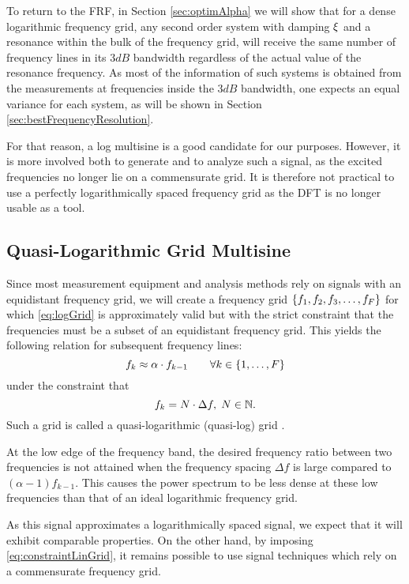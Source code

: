   To return to the FRF, in Section \ref{sec:optimAlpha} we will show that for a dense logarithmic frequency grid, any second order system with damping $\xi$ and a resonance within the bulk of the frequency grid, will receive the same number of frequency lines in its $3 \unit{dB}$ bandwidth regardless of the actual value of the resonance frequency.
  As most of the information of such systems is obtained from the measurements at frequencies inside the $3 \unit{dB}$
  bandwidth, one expects an equal variance for each system, as will be shown in Section \ref{sec:bestFrequencyResolution}.
  
  For that reason, a log multisine is a good candidate for our purposes.
  However, it is more involved both to generate and to analyze such a signal,
  as the excited frequencies no longer lie on a commensurate grid.
  It is therefore not practical to use a perfectly logarithmically spaced frequency grid as the DFT is no longer usable as a tool.
  
\subsection{Quasi-Logarithmic Grid Multisine}
  Since most measurement equipment and analysis methods rely on signals with an equidistant frequency grid, we will create a frequency grid
  $\left\{f_1, f_2, f_3,\ldots, f_F\right\}$ for which \eqref{eq:logGrid} is approximately 
  valid but with the strict constraint that the frequencies must be a subset 
  of an equidistant frequency grid. This yields the following relation for 
  subsequent frequency lines:
  \begin{equation}
    f_k \approx \alpha \cdot f_{k-1}
    \qquad \forall k \in \left\{1,\ldots,F\right\}
  \label{eq:qlogGrid}
  \end{equation}
  under the constraint that
  \begin{equation}
    f_k = N \cdot \Delta f,\; N \in \mathbb{N}
    \text{.}
    \label{eq:constraintLinGrid}
  \end{equation}
  Such a grid is called a quasi-logarithmic (quasi-log) grid \citep{Pintelon2001}. 
  
  At the low edge of the frequency band, the desired frequency ratio between two
  frequencies is not attained when the frequency spacing $\Delta f$ is large
  compared to $\left(\alpha -1 \right) f_{k-1}$.
  This causes the power spectrum to be less dense at these low frequencies than that of an ideal logarithmic frequency grid.
  
  As this signal approximates a logarithmically spaced signal,
  we expect that it will exhibit comparable properties.
  On the other hand, by imposing \eqref{eq:constraintLinGrid}, it remains
  possible to use signal techniques which rely on a commensurate frequency grid.

